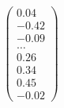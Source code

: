 \documentclass[preview]{standalone}
\begin{document}
\begin{align*}
\begin{pmatrix} 0.04 \\ -0.42 \\ -0.09 \\ \dots \\ 0.26 \\ 0.34 \\ 0.45 \\ -0.02 \end{pmatrix}
\end{align*}
\end{document}
